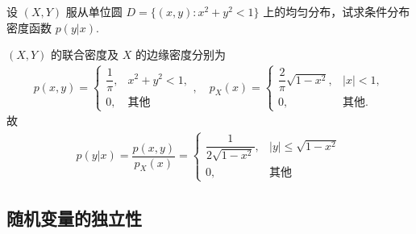 \begin{frame}
	\begin{exam}
		设 $(X,Y)$ 服从单位圆 $D=\{(x,y):x^2+y^2<1\}$ 上的均匀分布，试求条件分布密度函数 $p (y|x)$.
	\end{exam}

	\jieda
	$(X,Y)$ 的联合密度及 $X$ 的边缘密度分别为
	\begin{eqnarray*}
		p(x,y)=\left\{
		\begin{array}{ll}
			\dfrac{1}{\pi}, & x^2+y^2<1,\\
			0, & \mbox{其他}
		\end{array}\right. ,\quad
		p_X(x)=\left\{\begin{array}{ll}
			\dfrac{2}{\pi}\sqrt{1-x^2}, & |x|<1,\\
			0, & \mbox{其他}.
		\end{array}\right.
	\end{eqnarray*}
	\pause 故
	\begin{eqnarray*}
		p(y|x)=\dfrac{p(x,y)}{p_X(x)}=\left\{
		\begin{array}{ll}
			\dfrac{1}{2\sqrt{1-x^2}}, & |y|\le \sqrt{1-x^2}\\
			0, &\mbox{其他}
		\end{array}
		\right.
	\end{eqnarray*}

\end{frame}


\subsection{随机变量的独立性}


